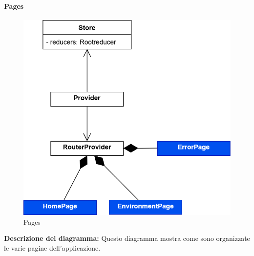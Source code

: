 \pagebreak

\paragraph{Pages}
\begin{figure}[h!] \centering
      \includegraphics[scale=0.3]{template/images/uml_front/ui/pages.png}
      \caption{Pages}
\end{figure}
\textbf{Descrizione del diagramma:}
Questo diagramma mostra come sono organizzate le varie pagine dell'applicazione.
